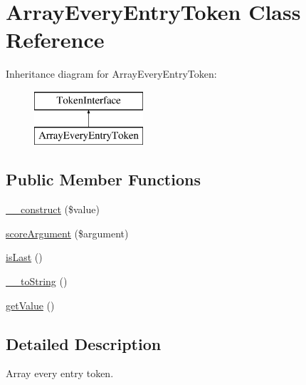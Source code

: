 \hypertarget{class_prophecy_1_1_argument_1_1_token_1_1_array_every_entry_token}{}\section{Array\+Every\+Entry\+Token Class Reference}
\label{class_prophecy_1_1_argument_1_1_token_1_1_array_every_entry_token}
Inheritance diagram for Array\+Every\+Entry\+Token\+:\begin{figure}[H]
\begin{center}
\leavevmode
\includegraphics[height=2.000000cm]{class_prophecy_1_1_argument_1_1_token_1_1_array_every_entry_token}
\end{center}
\end{figure}
\subsection*{Public Member Functions}
\begin{DoxyCompactItemize}
\item 
\mbox{\hyperlink{class_prophecy_1_1_argument_1_1_token_1_1_array_every_entry_token_a7e17a19b592345a03763f050fffe0ce7}{\+\_\+\+\_\+construct}} (\$value)
\item 
\mbox{\hyperlink{class_prophecy_1_1_argument_1_1_token_1_1_array_every_entry_token_a8d5bf47ab6eaa935458d5ad160e52822}{score\+Argument}} (\$argument)
\item 
\mbox{\hyperlink{class_prophecy_1_1_argument_1_1_token_1_1_array_every_entry_token_ac72b8349b1340887fc1af30eca2b951c}{is\+Last}} ()
\item 
\mbox{\hyperlink{class_prophecy_1_1_argument_1_1_token_1_1_array_every_entry_token_a7516ca30af0db3cdbf9a7739b48ce91d}{\+\_\+\+\_\+to\+String}} ()
\item 
\mbox{\hyperlink{class_prophecy_1_1_argument_1_1_token_1_1_array_every_entry_token_ac0bc18784b182c89fcfd276625aef435}{get\+Value}} ()
\end{DoxyCompactItemize}


\subsection{Detailed Description}
Array every entry token.


